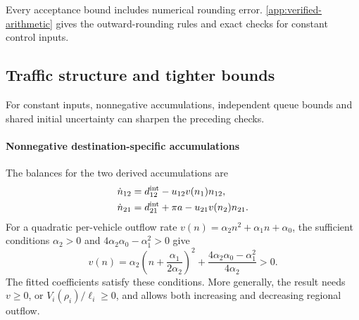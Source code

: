 \documentclass[preprint,12pt]{elsarticle}
\theoremstyle{definition}
\theoremstyle{plain}
\theoremstyle{definition}
\theoremstyle{plain}
\newcommand{\appref}[1]{\ref{#1}}
\begin{document}
Every acceptance bound includes numerical rounding error.
\appref{app:verified-arithmetic} gives the outward-rounding rules and
exact checks for constant control inputs.

\subsection{Traffic structure and tighter bounds}
\label{sec:structure-certificate}
\label{app:structure-proof}

For constant inputs, nonnegative accumulations, independent queue bounds
and shared initial uncertainty can sharpen the preceding checks.

\paragraph{Nonnegative destination-specific accumulations}
The balances for the two derived accumulations are
\begin{equation}
 \begin{aligned}
 \dot n_{12}&=d^{\rm int}_{12}-u_{12}v(n_1)n_{12},\\
 \dot n_{21}&=d^{\rm int}_{21}+\pi a-u_{21}v(n_2)n_{21}.
 \end{aligned}
 \label{eq:structure-derived-classes}
\end{equation}
For a quadratic per-vehicle outflow rate
$v(n)=\alpha_2n^2+\alpha_1n+\alpha_0$, the sufficient conditions
$\alpha_2>0$ and $4\alpha_2\alpha_0-\alpha_1^2>0$ give
\begin{equation}
 v(n)=\alpha_2\left(n+\frac{\alpha_1}{2\alpha_2}\right)^2+
                    \frac{4\alpha_2\alpha_0-\alpha_1^2}{4\alpha_2}>0.
 \label{eq:structure-positive-factor}
\end{equation}
The fitted coefficients satisfy these conditions. More generally,
the result needs $v\ge0$, or $V_i(\rho_i)/\ell_i\ge0$, and allows
both increasing and decreasing regional outflow.
\end{document}
